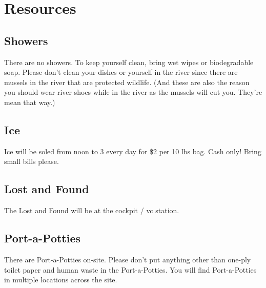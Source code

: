 \newpage
\section*{Resources}

\subsection*{Showers}
There are no showers. To keep yourself clean, bring wet wipes or biodegradable soap.
Please don't clean your dishes or yourself in the river since there are mussels in the river that are protected wildlife.  (And these are also the reason you should wear river shoes while in the river as the mussels will cut you. They're mean that way.)

\subsection*{Ice}
Ice will be soled from noon to 3 \pm every day for \$2 per 10 lbs bag.  Cash only! Bring small bills please. 


\subsection*{Lost and Found}
The Lost and Found will be at the \gls{cockpit} / \gls{vc} station.

\subsection*{Port-a-Potties}
There are Port-a-Potties on-site. Please don't put anything other than one-ply toilet paper and human waste in the Port-a-Potties. You will find Port-a-Potties in multiple locations across the site.




